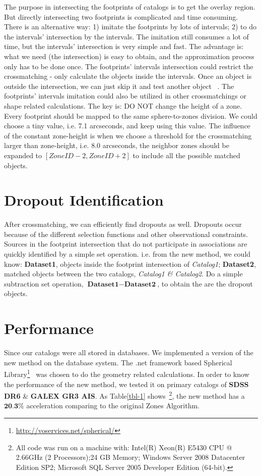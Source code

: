 The purpose in intersecting the footprints of catalogs is to get the overlay region. But directly intersecting two footprints is complicated and time consuming. There is an alternative way: 1) imitate the footprints by lots of intervals; 2) to do the intervals' intersection by the intervals. The imitation still consumes a lot of time, but the intervals' intersection is very simple and fast. The advantage is: what we need (the intersection) is easy to obtain, and the approximation process only has to be done once. The footprints' intervals intersection could restrict the crossmatching - only calculate the objects inside the intervals. Once an object is outside the intersection, we can just skip it and test another object ~\citep{dongwei}. The footprints' intervals imitation could also be utilized in other crossmatchings or shape related calculations. The key is: DO NOT change the height of a zone. Every footprint should be mapped to the same sphere-to-zones division. We could choose a tiny value, i.e. 7.1 arcseconds, and keep using this value. The influence of the constant zone-height is when we choose a threshold for the crossmatching larger than zone-height, i.e. 8.0 arcseconds, the neighbor zones should be expanded to $\left[\textit{ZoneID}-2,\textit{ZoneID}+2\right]$ to include all the possible matched objects. 

\section{Dropout Identification}
After crossmatching, we can efficiently find dropouts as well. Dropouts occur because of the different selection functions and other observational constraints. Sources in the footprint intersection that do not participate in associations are quickly identified by a simple set operation. i.e. from the new method, we could know: \textbf{Dataset1}, objects inside the footprint intersection of \textit{Catalog1}; \textbf{Dataset2}, matched objects between the two catalogs, \textit{Catalog1 \& Catalog2}. Do a simple subtraction set operation, $\textbf{Dataset1}-\textbf{Dataset2}$, to obtain the are the dropout objects.

\section{Performance}
Since our catalogs were all stored in databases. We implemented a version of the new method on the database system. The .net framework based Spherical Library\footnote{\url{http://voservices.net/spherical/}}~\citep{Budavari:2010ek, 2007cs........1163G} was chosen to do the geometry related calculations. In order to know the performance of the new method, we tested it on primary catalogs of \textbf{SDSS DR6} \& \textbf{GALEX GR3 AIS}. As Table\ref{tbl-1} shows~\footnote{All code was run on a machine with: Intel(R) Xeon(R) E5430 CPU @ 2.66GHz (2 Processors);24 GB Memory; Windows Server 2008 Datacenter Edition SP2; Microsoft SQL Server 2005 Developer Edition (64-bit).}, the new method has a $\textbf{20.3\%}$ acceleration comparing to the original Zones Algorithm.

